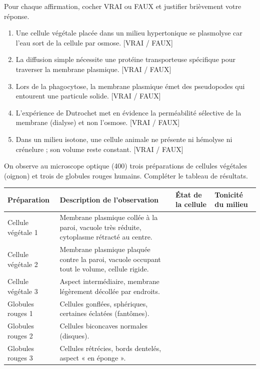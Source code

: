 \documentclass[11pt]{article}
\begin{document}
\begin{exercice}
Pour chaque affirmation, cocher VRAI ou FAUX et justifier brièvement votre réponse.
\begin{enumerate}
    \item Une cellule végétale placée dans un milieu hypertonique se plasmolyse car l'eau sort de la cellule par osmose. \hfill [VRAI / FAUX]
    \item La diffusion simple nécessite une protéine transporteuse spécifique pour traverser la membrane plasmique. \hfill [VRAI / FAUX]
    \item Lors de la phagocytose, la membrane plasmique émet des pseudopodes qui entourent une particule solide. \hfill [VRAI / FAUX]
    \item L'expérience de Dutrochet met en évidence la perméabilité sélective de la membrane (dialyse) et non l'osmose. \hfill [VRAI / FAUX]
    \item Dans un milieu isotone, une cellule animale ne présente ni hémolyse ni crénelure ; son volume reste constant. \hfill [VRAI / FAUX]
\end{enumerate}
\end{exercice}

\begin{exercice}
On observe au microscope optique (\SI{400}{\times}) trois préparations de cellules végétales (oignon) et trois de globules rouges humains. Compléter le tableau de résultats.
\begin{tabular}{|p{3.5cm}|p{4.5cm}|p{3.5cm}|p{3.5cm}|}
\hline
Préparation & Description de l'observation & État de la cellule & Tonicité du milieu \\
\hline
Cellule végétale 1 & Membrane plasmique collée à la paroi, vacuole très réduite, cytoplasme rétracté au centre. & & \\
\hline
Cellule végétale 2 & Membrane plasmique plaquée contre la paroi, vacuole occupant tout le volume, cellule rigide. & & \\
\hline
Cellule végétale 3 & Aspect intermédiaire, membrane légèrement décollée par endroits. & & \\
\hline
Globules rouges 1 & Cellules gonflées, sphériques, certaines éclatées (fantômes). & & \\
\hline
Globules rouges 2 & Cellules biconcaves normales (disques). & & \\
\hline
Globules rouges 3 & Cellules rétrécies, bords dentelés, aspect « en éponge ». & & \\
\hline
\end{tabular}
\end{exercice}
\end{document}
